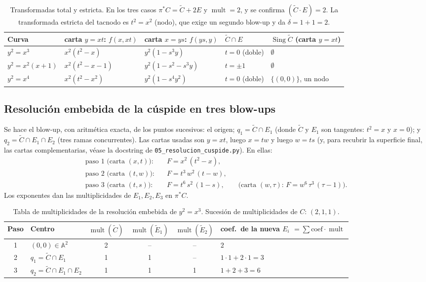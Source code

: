 \documentclass[11pt,a4paper]{article}
\newcommand{\mult}{\operatorname{mult}}
\newcommand{\Sing}{\operatorname{Sing}}
\newcommand{\A}{\mathbb{A}}
\theoremstyle{plain}
\theoremstyle{definition}
\theoremstyle{remark}
\newcommand{\fragmento}[3]{\VerbatimInput[fontsize=\footnotesize,frame=single,framesep=2mm,firstline=#2,lastline=#3]{#1}}
\begin{document}
\begin{table}[ht]
\centering
\small
\begin{tabular}{@{}l l l l l@{}}
\toprule
Curva & carta $y=xt$: $f(x,xt)$ & carta $x=ys$: $f(ys,y)$ & $\tilde C\cap E$ & $\Sing\tilde C$ (carta $y=xt$) \\
\midrule
$y^2=x^3$ & $x^2(t^2-x)$ & $y^2(1-s^3y)$ & $t=0$ (doble) & $\emptyset$ \\
$y^2=x^2(x+1)$ & $x^2(t^2-x-1)$ & $y^2(1-s^2-s^3y)$ & $t=\pm1$ & $\emptyset$ \\
$y^2=x^4$ & $x^2(t^2-x^2)$ & $y^2(1-s^4y^2)$ & $t=0$ (doble) & $\{(0,0)\}$, un nodo \\
\bottomrule
\end{tabular}
\caption{Transformadas total y estricta. En los tres casos $\pi^*C=\tilde C+2E$ y $\operatorname{mult}=2$, y se confirma $(\tilde C\cdot E)=2$. La transformada estricta del tacnodo es $t^2=x^2$ (nodo), que exige un segundo blow-up y da $\delta=1+1=2$.}
\end{table}

\fragmento{codigo/simbolico/explosion.py}{28}{56}

\subsection{Resolución embebida de la cúspide en tres blow-ups}\label{sec:resolucion}

Se hace el blow-up, con aritmética exacta, de los puntos sucesivos: el origen; $q_1=\tilde C\cap E_1$ (donde $\tilde C$ y $E_1$ son tangentes: $t^2=x$ y $x=0$); y $q_2=\tilde C\cap E_1\cap E_2$ (tres ramas concurrentes). Las cartas usadas son $y=xt$, luego $x=tw$ y luego $w=ts$ (y, para recubrir la superficie final, las cartas complementarias, véase la docstring de \texttt{05\_resolucion\_cuspide.py}). En ellas:
\begin{align*}
\text{paso 1 (carta $(x,t)$):}&\quad F=x^2\,(t^2-x),\\
\text{paso 2 (carta $(t,w)$):}&\quad F=t^3\,w^2\,(t-w),\\
\text{paso 3 (carta $(t,s)$):}&\quad F=t^6\,s^2\,(1-s),\qquad\text{(carta $(w,\tau)$: } F=w^6\,\tau^3\,(\tau-1)).
\end{align*}
Los exponentes dan las multiplicidades de $E_1,E_2,E_3$ en $\pi^*C$.

\begin{table}[ht]
\centering
\small
\begin{tabular}{@{}c l c c c l@{}}
\toprule
Paso & Centro & $\mult(\tilde C)$ & $\mult(\tilde E_1)$ & $\mult(\tilde E_2)$ & coef.\ de la nueva $E_i$ $=\sum\text{coef}\cdot\mult$ \\
\midrule
1 & $(0,0)\in\A^2$ & 2 & -- & -- & $2$ \\
2 & $q_1=\tilde C\cap E_1$ & 1 & 1 & -- & $1\cdot1+2\cdot1=3$ \\
3 & $q_2=\tilde C\cap E_1\cap E_2$ & 1 & 1 & 1 & $1+2+3=6$ \\
\bottomrule
\end{tabular}
\caption{Tabla de multiplicidades de la resolución embebida de $y^2=x^3$. Sucesión de multiplicidades de $C$: $(2,1,1)$.}
\end{table}
\end{document}
